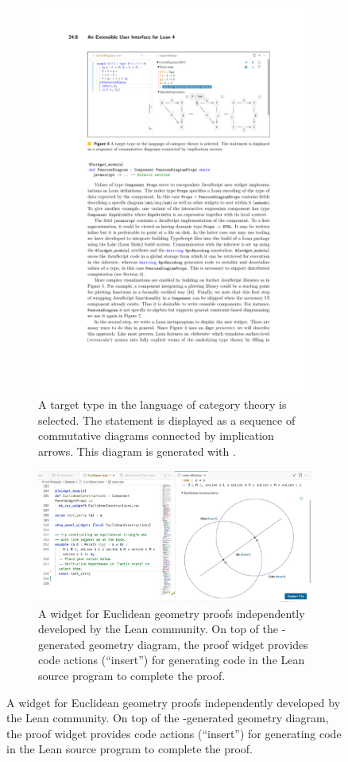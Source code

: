 \begin{figure}[h!]
    \centering
    \begin{subfigure}{\textwidth}
        \centering
        \includegraphics[width=.8\textwidth]{assets/lean-penrose.pdf}
        \caption{A target type in the language of category theory is selected. The statement is displayed as a sequence of commutative diagrams connected by implication arrows. This diagram is generated with \Penrose{}.}
        \label{fig:lean-penrose}
    \end{subfigure}
    
    \begin{subfigure}{\textwidth}
        \centering
        \includegraphics[width=.8\textwidth]{assets/lean-euclidean.pdf}
        \caption{A widget for Euclidean geometry proofs independently developed by the Lean community. On top of the \Penrose{}-generated geometry diagram, the proof widget provides code actions (``insert'') for generating code in the Lean source program to complete the proof.}
        \label{fig:lean-euclidean}
    \end{subfigure}
    

\end{figure}
